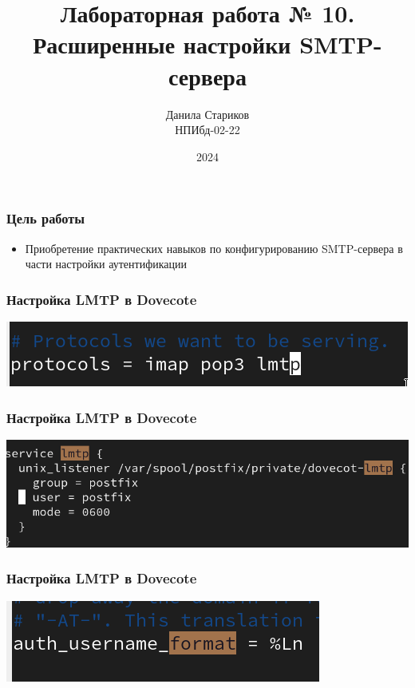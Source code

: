 

\title{Лабораторная работа № 10. \\Расширенные настройки SMTP-сервера}
\author{Данила Стариков \\ НПИбд-02-22}
\date{2024}



\frame{\titlepage}

\begin{frame}
\frametitle{Цель работы}
\begin{itemize}
    \item Приобретение практических навыков по конфигурированию SMTP-сервера в части настройки аутентификации
\end{itemize}
\end{frame}

\begin{frame}
  \frametitle{Настройка LMTP в Dovecote}
  \centering
  \includegraphics[width=\textwidth]{../images/image01.png}
\end{frame}

\begin{frame}
  \frametitle{Настройка LMTP в Dovecote}
  \centering
  \includegraphics[width=\textwidth]{../images/image02.png}
\end{frame}

\begin{frame}
  \frametitle{Настройка LMTP в Dovecote}
  \centering
  \includegraphics[width=\textwidth]{../images/image03.png}
\end{frame}


